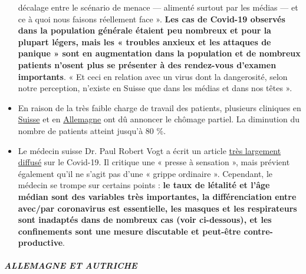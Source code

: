 \begin{itemize}
  décalage entre le scénario de menace --- alimenté surtout par les
  médias --- et ce à quoi nous faisons réellement face ». \textbf{Les
  cas de Covid-19 observés dans la population générale étaient peu
  nombreux et pour la plupart légers, mais les « troubles anxieux et les
  attaques de panique » sont en augmentation dans la population et de
  nombreux patients n'osent plus se présenter à des rendez-vous d'examen
  importants}. « Et ceci en relation avec un virus dont la dangerosité,
  selon notre perception, n'existe en Suisse que dans les médias et dans
  nos têtes ».
\item
  En raison de la très faible charge de travail des patients, plusieurs
  cliniques en
  \href{https://www.20min.ch/schweiz/news/story/Spitaeler-28949526}{Suisse}
  et en
  \href{https://www.spiegel.de/wirtschaft/unternehmen/trotz-corona-pandemie-warum-kliniken-jetzt-kurzarbeit-anmelden-a-3dc61bc9-fb12-4298-8022-bb4c2be39d7d}{Allemagne}
  ont dû annoncer le chômage partiel. La diminution du nombre de
  patients atteint jusqu'à 80 \%.
\item
  Le médecin suisse Dr. Paul Robert Vogt a écrit un article
  \href{https://www.mittellaendische.ch/2020/04/07/covid-19-eine-zwischenbilanz-oder-eine-analyse-der-moral-der-medizinischen-fakten-sowie-der-aktuellen-und-zuk\%C3\%BCnftigen-politischen-entscheidungen/}{très
  largement diffusé} sur le Covid-19. Il critique une « presse à
  sensation », mais prévient également qu'il ne s'agit pas d'une «
  grippe ordinaire ». Cependant, le médecin se trompe sur certains
  points : \textbf{le taux de létalité et l'âge médian sont des
  variables très importantes, la différenciation entre avec/par
  coronavirus est essentielle, les masques et les respirateurs sont
  inadaptés dans de nombreux cas (voir ci-dessous), et les confinements
  sont une mesure discutable et peut-être contre-productive}.
\end{itemize}

\hypertarget{allemagne-et-autriche}{%
\subparagraph{\texorpdfstring{\textbf{ALLEMAGNE ET
AUTRICHE}}{ALLEMAGNE ET AUTRICHE}}\label{allemagne-et-autriche}}

